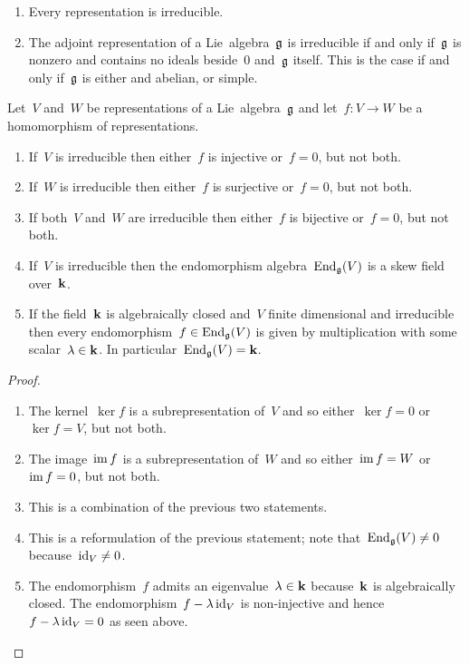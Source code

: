 \begin{example}
  \leavevmode
  \begin{enumerate}
    \item
      Every {\onedimensional} representation is irreducible.
    \item
      The adjoint representation of a Lie~algebra~$\mathfrak{g}$ is irreducible if and only if~$\mathfrak{g}$ is nonzero and contains no ideals beside~$0$ and~$\mathfrak{g}$ itself.
      This is the case if and only if~$\mathfrak{g}$ is either {\onedimensional} and abelian, or simple.
  \end{enumerate}
\end{example}


\begin{lemma}[Schur]
  Let~$V$ and~$W$ be representations of a Lie~algebra~$\mathfrak{g}$ and let~$f \colon V \to W$ be a homomorphism of representations.
  \begin{enumerate}
    \item
      If~$V$ is irreducible then either~$f$ is injective or~$f = 0$, but not both.
    \item
      If~$W$ is irreducible then either~$f$ is surjective or~$f = 0$, but not both.
    \item
      If both~$V$ and~$W$ are irreducible then either~$f$ is bijective or~$f = 0$, but not both.
    \item
      If~$V$ is irreducible then the endomorphism algebra~$\operatorname{End}_{\mathfrak{g}}(V)$ is a skew field over~$\mathbf{k}$.
    \item
      If the field~$\mathbf{k}$ is algebraically closed and~$V$ finite dimensional and irreducible then every endomorphism~$f \in \operatorname{End}_{\mathfrak{g}}(V)$ is given by multiplication with some scalar~$\lambda \in \mathbf{k}$.
      In particular~$\operatorname{End}_{\mathfrak{g}}(V) = \mathbf{k}$.
  \end{enumerate}
\end{lemma}


\begin{proof}
  \leavevmode
  \begin{enumerate}
    \item
      The kernel~$\ker f$ is a subrepresentation of~$V$ and so either~$\ker f = 0$ or~$\ker f = V$, but not both.
    \item
      The image~$\operatorname{im} f$ is a subrepresentation of~$W$ and so either~$\operatorname{im} f = W$ or~$\operatorname{im} f = 0$, but not both.
    \item
      This is a combination of the previous two statements.
    \item
      This is a reformulation of the previous statement;
      note that~$\operatorname{End}_{\mathfrak{g}}(V) \neq 0$ because~$\operatorname{id}_V \neq 0$.
    \item
      The endomorphism~$f$ admits an eigenvalue~$\lambda \in \mathbf{k}$ because~$\mathbf{k}$ is algebraically closed.
      The endomorphism~$f - \lambda \operatorname{id}_V$ is non-injective and hence~$f - \lambda \operatorname{id}_V = 0$ as seen above.
    \qedhere
  \end{enumerate}
\end{proof}










